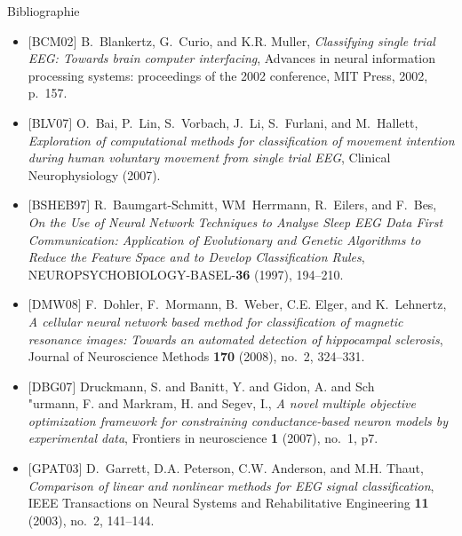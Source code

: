 \documentclass{beamer}
\begin{document}
\begin{frame}[allowframebreaks]{Bibliographie}
    \begin{itemize}
        \item $[$BCM02$]$
        B.~Blankertz, G.~Curio, and K.R. Muller,
        \emph{{Classifying single trial EEG: Towards brain computer
        interfacing}},
        Advances in neural information processing systems: proceedings of the
        2002 conference,
        MIT Press, 2002, p.~157.

        \item $[$BLV07$]$
        O.~Bai, P.~Lin, S.~Vorbach, J.~Li, S.~Furlani, and M.~Hallett,
        \emph{{Exploration of computational methods for classification of
        movement intention during human voluntary movement from single trial
        EEG}},
        Clinical Neurophysiology (2007).

        \item $[$BSHEB97$]$
        R.~Baumgart-Schmitt, WM~Herrmann, R.~Eilers, and F.~Bes,
        \emph{{On the Use of Neural Network Techniques to Analyse Sleep EEG
        Data First Communication: Application of Evolutionary and Genetic
        Algorithms to Reduce the Feature Space and to Develop Classification
        Rules}},
        NEUROPSYCHOBIOLOGY-BASEL-\textbf{36} (1997), 194--210.

        \item $[$DMW08$]$
        F.~Dohler, F.~Mormann, B.~Weber, C.E. Elger, and K.~Lehnertz,
        \emph{{A cellular neural network based method for classification of
        magnetic resonance images: Towards an automated detection of
        hippocampal sclerosis}},
        Journal of Neuroscience Methods \textbf{170} (2008), no.~2, 324--331.

        \item $[$DBG07$]$
        Druckmann, S. and Banitt, Y. and Gidon, A. and Sch{\\"u}rmann, F. and
        Markram, H. and Segev, I.,
        \emph{{A novel multiple objective optimization framework for
        constraining conductance-based neuron models by experimental data}},
        Frontiers in neuroscience \textbf{1} (2007), no.~1, p7.

        \item $[$GPAT03$]$
        D.~Garrett, D.A. Peterson, C.W. Anderson, and M.H. Thaut,
        \emph{{Comparison of linear and nonlinear methods for EEG signal
        classification}},
        IEEE Transactions on Neural Systems and Rehabilitative Engineering
        \textbf{11} (2003), no.~2, 141--144.


\end{itemize}
\end{frame}
\end{document}
